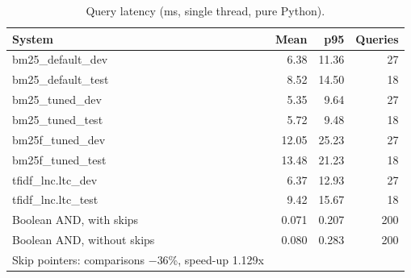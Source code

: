 \begin{table}[t]
\centering
\small
\begin{tabular}{lrrr}
\toprule
System & Mean & p95 & Queries \\
\midrule
bm25\_default\_dev & 6.38 & 11.36 & 27 \\
bm25\_default\_test & 8.52 & 14.50 & 18 \\
bm25\_tuned\_dev & 5.35 & 9.64 & 27 \\
bm25\_tuned\_test & 5.72 & 9.48 & 18 \\
bm25f\_tuned\_dev & 12.05 & 25.23 & 27 \\
bm25f\_tuned\_test & 13.48 & 21.23 & 18 \\
tfidf\_lnc.ltc\_dev & 6.37 & 12.93 & 27 \\
tfidf\_lnc.ltc\_test & 9.42 & 15.67 & 18 \\
Boolean AND, with skips & 0.071 & 0.207 & 200 \\
Boolean AND, without skips & 0.080 & 0.283 & 200 \\
Skip pointers: comparisons $-$36\%, speed-up 1.129x &  &  &  \\
\bottomrule
\end{tabular}
\caption{Query latency (ms, single thread, pure Python).}
\label{tab:efficiency}
\end{table}
